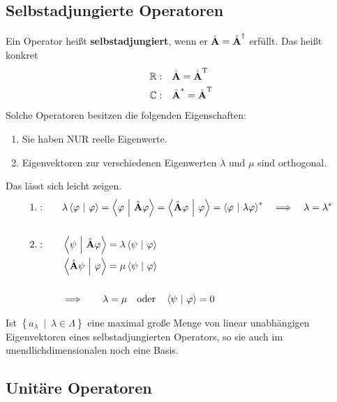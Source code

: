 \documentclass[a4paper,12pt,portrait]{book}
\numberwithin{equation}{section}
\begin{document}
\subsection{Selbstadjungierte Operatoren}

Ein Operator heißt \textbf{selbstadjungiert}, wenn er $\hat{\textbf{A}}=\hat{\textbf{A}}^\dagger$ erfüllt. Das heißt konkret
\begin{align*}
\mathbb{R}:\quad &\hat{\textbf{A}}=\hat{\textbf{A}}^{\text{T}}\\
\mathbb{C}:\quad &\hat{\textbf{A}}^* = \hat{\textbf{A}}^{\text{T}}
\end{align*}
Solche Operatoren besitzen die folgenden Eigenschaften: 
\begin{enumerate}
	\item Sie haben NUR reelle Eigenwerte.
	\item Eigenvektoren zur verschiedenen Eigenwerten $\lambda$ und $\mu$ sind orthogonal.
\end{enumerate}
Das lässt sich leicht zeigen. 
\begin{align*}
1.:\qquad &\lambda\scap{\varphi}{\varphi}=\scap{\varphi}{\operator{A}\varphi}=\scap{\operator{A}\varphi}{\varphi}=\scap{\varphi}{\lambda\varphi}^* \quad \Longrightarrow \quad \lambda = \lambda^* \\ \ \\
2.:\qquad & \scap{\psi}{\operator{A}\varphi} = \lambda\scap{\psi}{\varphi} \\
& \scap{\operator{A}\psi}{\varphi} = \mu \scap{\psi}{\varphi} \\ \ \\
& \Longrightarrow \qquad \lambda = \mu \quad \text{oder}\quad\scap{\psi}{\varphi}=0
\end{align*}

Ist $\left\lbrace a_\lambda \ \middle| \ \lambda\in\Lambda \right\rbrace$ eine maximal große Menge von linear unabhängigen Eigenvektoren eines selbstadjungierten Operators, so sie auch im unendlichdimensionalen noch eine Basis.

\subsection{Unitäre Operatoren}
\end{document}
